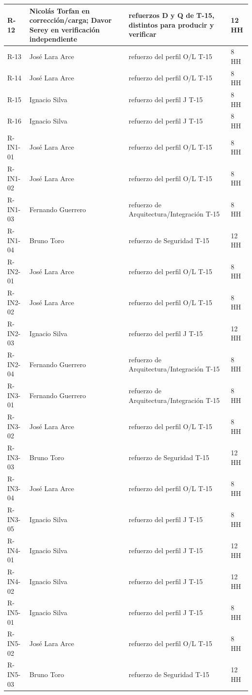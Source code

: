\begin{longtable}{L{.13\textwidth}L{.31\textwidth}L{.34\textwidth}L{.13\textwidth}}
R-12 & Nicolás Torfan en corrección/carga; Davor Serey en verificación independiente & refuerzos D y Q de T-15, distintos para producir y verificar & 12 HH\\\hline
R-13 & José Lara Arce & refuerzo del perfil O/L T-15 & 8 HH\\\hline
R-14 & José Lara Arce & refuerzo del perfil O/L T-15 & 8 HH\\\hline
R-15 & Ignacio Silva & refuerzo del perfil J T-15 & 8 HH\\\hline
R-16 & Ignacio Silva & refuerzo del perfil J T-15 & 8 HH\\\hline
R-IN1-01 & José Lara Arce & refuerzo del perfil O/L T-15 & 8 HH\\\hline
R-IN1-02 & José Lara Arce & refuerzo del perfil O/L T-15 & 8 HH\\\hline
R-IN1-03 & Fernando Guerrero & refuerzo de Arquitectura/Integración T-15 & 8 HH\\\hline
R-IN1-04 & Bruno Toro & refuerzo de Seguridad T-15 & 12 HH\\\hline
R-IN2-01 & José Lara Arce & refuerzo del perfil O/L T-15 & 8 HH\\\hline
R-IN2-02 & José Lara Arce & refuerzo del perfil O/L T-15 & 8 HH\\\hline
R-IN2-03 & Ignacio Silva & refuerzo del perfil J T-15 & 12 HH\\\hline
R-IN2-04 & Fernando Guerrero & refuerzo de Arquitectura/Integración T-15 & 8 HH\\\hline
R-IN3-01 & Fernando Guerrero & refuerzo de Arquitectura/Integración T-15 & 8 HH\\\hline
R-IN3-02 & José Lara Arce & refuerzo del perfil O/L T-15 & 8 HH\\\hline
R-IN3-03 & Bruno Toro & refuerzo de Seguridad T-15 & 12 HH\\\hline
R-IN3-04 & José Lara Arce & refuerzo del perfil O/L T-15 & 8 HH\\\hline
R-IN3-05 & Ignacio Silva & refuerzo del perfil J T-15 & 8 HH\\\hline
R-IN4-01 & Ignacio Silva & refuerzo del perfil J T-15 & 12 HH\\\hline
R-IN4-02 & Ignacio Silva & refuerzo del perfil J T-15 & 12 HH\\\hline
R-IN5-01 & Ignacio Silva & refuerzo del perfil J T-15 & 8 HH\\\hline
R-IN5-02 & José Lara Arce & refuerzo del perfil O/L T-15 & 8 HH\\\hline
R-IN5-03 & Bruno Toro & refuerzo de Seguridad T-15 & 12 HH\\\hline
\end{longtable}\endgroup
